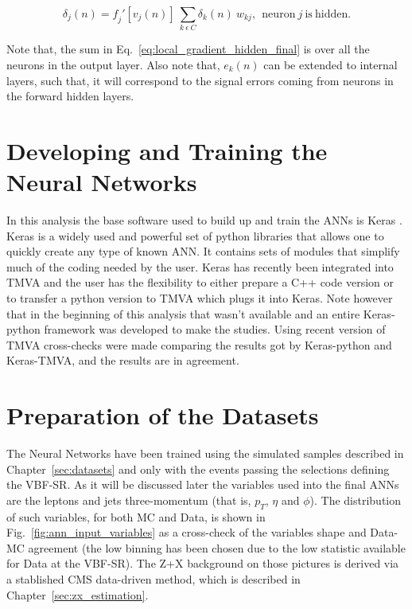 \begin{equation}
\label{eq:local_gradient_hidden_final}
\delta_{j}(n) = \mathit{f}_{j}'[v_{j}(n)] ~ \sum_{k~\epsilon~C} \delta_{k}(n) ~ w_{kj},~~\mathrm{neuron}~j~\mathrm{is~hidden}.
\end{equation}

Note that, the sum in Eq.~\ref{eq:local_gradient_hidden_final} is over all the neurons in the output layer. Also note that, $e_{k}(n)$ can be extended to internal layers, such that, it will correspond to the signal errors coming from neurons in the forward hidden layers.


\section{Developing and Training the Neural Networks}
\label{sec:developing_training_neural_networks}
In this analysis the base software used to build up and train the ANNs
is Keras \cite{bib:KerasWebPage}. Keras is a widely used and powerful set of python libraries that allows one to quickly create any type of known ANN. It contains sets of modules that simplify much of the coding needed by the user. Keras has recently been integrated into TMVA \cite{bib:JPhysConfSer_898_072046_2017} and the user has the flexibility to either prepare a C++ code version or to transfer a python version to TMVA which plugs it into Keras. Note however that in the beginning of this analysis that wasn't available and an entire Keras-python framework was developed to make the studies. Using recent version of TMVA cross-checks were made comparing the results got by Keras-python and Keras-TMVA, and the results are in agreement.

\section{Preparation of the Datasets}
\label{subsec:datasets_preparation}
The Neural Networks have been trained using the simulated samples described in Chapter~\ref{sec:datasets} and only with the events passing the selections defining the VBF-SR. As it will be discussed later the variables used into the final ANNs are the leptons and jets three-momentum (that is, $p_{T}$, $\eta$ and $\phi$). The distribution of such variables, for both MC and Data, is shown in Fig.~\ref{fig:ann_input_variables} as a cross-check of the variables shape and Data-MC agreement (the low binning has been chosen due to the low statistic available for Data at the VBF-SR). The Z+X background on those pictures is derived via a stablished CMS data-driven method, which is described in Chapter~\ref{sec:zx_estimation}.

